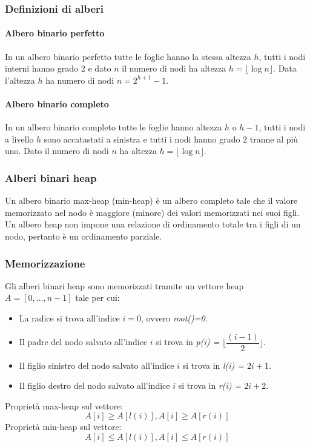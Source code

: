 \subsubsection{Definizioni di alberi}
\paragraph{Albero binario perfetto}
In un albero binario perfetto tutte le foglie hanno la stessa altezza $h$, tutti i nodi interni hanno grado $2$ e dato $n$ il numero di nodi ha altezza
$h=\lfloor \log n\rfloor$. Data l'altezza $h$ ha numero di nodi $n=2^{h+1}-1$.
\paragraph{Albero binario completo}
In un albero binario completo tutte le foglie hanno altezza $h$ o $h-1$, tutti i nodi a livello $h$ sono accatastati a sinistra e tutti i nodi hanno grado 
$2$ tranne al pi\`u uno. Dato il numero di nodi $n$ ha altezza $h=\lfloor \log n\rfloor$.
\subsubsection{Alberi binari heap}
Un albero binario max-heap (min-heap) \`e un albero completo tale che il valore memorizzato nel nodo \`e maggiore (minore) dei valori memorizzati nei suoi
figli. Un albero heap non impone una relazione di ordinamento totale tra i figli di un nodo, pertanto \`e un ordinamento parziale. 
\subsubsection{Memorizzazione}
Gli alberi binari heap sono memorizzati tramite un vettore heap $A=[0, \dots, n-1]$ tale per cui: 
\begin{itemize}
\item La radice si trova all'indice $i=0$, ovvero \emph{root()=0}.
\item Il padre del nodo salvato all'indice $i$ si trova in \emph{p(i) = $\biggl\lfloor\dfrac{(i-1)}{2} \biggr\rfloor$}.
\item Il figlio sinistro del nodo salvato all'indice $i$ si trova in \emph{l(i) = $2i+1$}.
\item Il figlio destro del nodo salvato all'indice $i$ si trova in \emph{r(i) = $2i+2$}.
\end{itemize}
Propriet\`a max-heap sul vettore: 
$$A[i]\ge A[l(i)], A[i]\ge A[r(i)]$$ 
Propriet\`a min-heap sul vettore: 
$$A[i]\le A[l(i)], A[i]\le A[r(i)]$$
